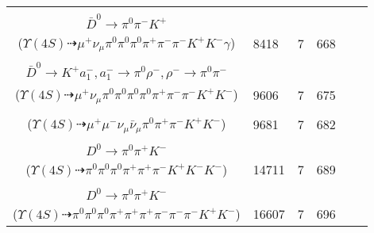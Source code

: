 \documentclass[landscape]{article}
\newcounter{rownumbers}
\newcommand\rn{\stepcounter{rownumbers}\arabic{rownumbers}}
\newcommand{\EOLP}{\\ \hline} %
\newcommand{\topoTags}[1]{#1} %
\begin{document}
\begin{longtable}{clcccc}
\rn & \makecell[l]{ $ 
\Upsilon(4S) \rightarrow B^{+} B^{-} ,
B^{+} \rightarrow \mu^{+} \nu_{\mu} \bar{D}^{*0} ,
B^{-} \rightarrow \rho^{-} D^{0} ,
\bar{D}^{*0} \rightarrow \bar{D}^{0} \gamma ,
\rho^{-} \rightarrow \pi^{0} \pi^{-} ,
D^{0} \rightarrow \pi^{0} \pi^{+} K^{-} ,
$ \\ $
\bar{D}^{0} \rightarrow \pi^{0} \pi^{-} K^{+} 
$ \\ ($
\Upsilon(4S) \dashrightarrow \mu^{+} \nu_{\mu} \pi^{0} \pi^{0} \pi^{0} \pi^{+} \pi^{-} \pi^{-} K^{+} K^{-} \gamma 
$) } & \topoTags{8418 & }7 & 668 \EOLP

\rn & \makecell[l]{ $ 
\Upsilon(4S) \rightarrow B^{+} B^{-} ,
B^{+} \rightarrow \mu^{+} \nu_{\mu} \bar{D}^{*0} ,
B^{-} \rightarrow \rho^{-} D^{0} ,
\bar{D}^{*0} \rightarrow \pi^{0} \bar{D}^{0} ,
\rho^{-} \rightarrow \pi^{0} \pi^{-} ,
D^{0} \rightarrow \pi^{+} K^{-} ,
$ \\ $
\bar{D}^{0} \rightarrow K^{+} a_{1}^{-} ,
a_{1}^{-} \rightarrow \pi^{0} \rho^{-} ,
\rho^{-} \rightarrow \pi^{0} \pi^{-} 
$ \\ ($
\Upsilon(4S) \dashrightarrow \mu^{+} \nu_{\mu} \pi^{0} \pi^{0} \pi^{0} \pi^{0} \pi^{+} \pi^{-} \pi^{-} K^{+} K^{-} 
$) } & \topoTags{9606 & }7 & 675 \EOLP

\rn & \makecell[l]{ $ 
\Upsilon(4S) \rightarrow B^{+} B^{-} ,
B^{+} \rightarrow \mu^{+} \nu_{\mu} \bar{D}^{0} ,
B^{-} \rightarrow \rho^{-} D^{0} ,
\bar{D}^{0} \rightarrow \mu^{-} \bar{\nu}_{\mu} K^{+} ,
\rho^{-} \rightarrow \pi^{0} \pi^{-} ,
D^{0} \rightarrow \pi^{+} K^{-} 
$ \\ ($
\Upsilon(4S) \dashrightarrow \mu^{+} \mu^{-} \nu_{\mu} \bar{\nu}_{\mu} \pi^{0} \pi^{+} \pi^{-} K^{+} K^{-} 
$) } & \topoTags{9681 & }7 & 682 \EOLP

\rn & \makecell[l]{ $ 
\Upsilon(4S) \rightarrow B^{+} B^{-} ,
B^{+} \rightarrow \rho^{+} \bar{D}^{0} ,
B^{-} \rightarrow \rho^{-} D^{0} ,
\rho^{+} \rightarrow \pi^{0} \pi^{+} ,
\bar{D}^{0} \rightarrow K^{+} K^{-} ,
\rho^{-} \rightarrow \pi^{0} \pi^{-} ,
$ \\ $
D^{0} \rightarrow \pi^{0} \pi^{+} K^{-} 
$ \\ ($
\Upsilon(4S) \dashrightarrow \pi^{0} \pi^{0} \pi^{0} \pi^{+} \pi^{+} \pi^{-} K^{+} K^{-} K^{-} 
$) } & \topoTags{14711 & }7 & 689 \EOLP

\rn & \makecell[l]{ $ 
\Upsilon(4S) \rightarrow B^{+} B^{-} ,
B^{+} \rightarrow \rho^{+} \bar{D}^{0} ,
B^{-} \rightarrow \rho^{0} \pi^{-} D^{0} ,
\rho^{+} \rightarrow \pi^{0} \pi^{+} ,
\bar{D}^{0} \rightarrow \pi^{0} \pi^{-} K^{+} ,
\rho^{0} \rightarrow \pi^{+} \pi^{-} ,
$ \\ $
D^{0} \rightarrow \pi^{0} \pi^{+} K^{-} 
$ \\ ($
\Upsilon(4S) \dashrightarrow \pi^{0} \pi^{0} \pi^{0} \pi^{+} \pi^{+} \pi^{+} \pi^{-} \pi^{-} \pi^{-} K^{+} K^{-} 
$) } & \topoTags{16607 & }7 & 696 \EOLP


\end{longtable}
\end{document}
